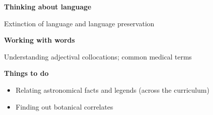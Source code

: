\vspace{1.5em}
\noindent \textbf{\large Thinking about language}
\nopagebreak

\vspace{0.5em}
\noindent Extinction of language and language preservation

\vspace{1.5em}
\noindent \textbf{\large Working with words}
\nopagebreak

\vspace{0.5em}
\noindent Understanding adjectival collocations; common medical terms

\vspace{1.5em}
\noindent \textbf{\large Things to do}
\nopagebreak

\begin{itemize}[leftmargin=1.5em]
    \item Relating astronomical facts and legends (across the curriculum)
    \item Finding out botanical correlates
\end{itemize}



